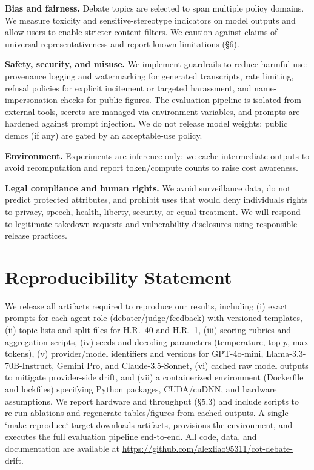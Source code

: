 \documentclass[11pt]{article}
\begin{document}
\textbf{Bias and fairness.} Debate topics are selected to span multiple policy domains. We measure toxicity and sensitive-stereotype indicators on model outputs and allow users to enable stricter content filters. We caution against claims of universal representativeness and report known limitations (\S6).

\textbf{Safety, security, and misuse.} We implement guardrails to reduce harmful use: provenance logging and watermarking for generated transcripts, rate limiting, refusal policies for explicit incitement or targeted harassment, and name-impersonation checks for public figures. The evaluation pipeline is isolated from external tools, secrets are managed via environment variables, and prompts are hardened against prompt injection. We do not release model weights; public demos (if any) are gated by an acceptable-use policy.

\textbf{Environment.} Experiments are inference-only; we cache intermediate outputs to avoid recomputation and report token/compute counts to raise cost awareness.

\textbf{Legal compliance and human rights.} We avoid surveillance data, do not predict protected attributes, and prohibit uses that would deny individuals rights to privacy, speech, health, liberty, security, or equal treatment. We will respond to legitimate takedown requests and vulnerability disclosures using responsible release practices.


\section*{Reproducibility Statement}
We release all artifacts required to reproduce our results, including (i) exact prompts for each agent role (debater/judge/feedback) with versioned templates, (ii) topic lists and split files for H.R.~40 and H.R.~1, (iii) scoring rubrics and aggregation scripts, (iv) seeds and decoding parameters (temperature, top-$p$, max tokens), (v) provider/model identifiers and versions for GPT-4o-mini, Llama-3.3-70B-Instruct, Gemini Pro, and Claude-3.5-Sonnet, (vi) cached raw model outputs to mitigate provider-side drift, and (vii) a containerized environment (Dockerfile and lockfiles) specifying Python packages, CUDA/cuDNN, and hardware assumptions. We report hardware and throughput (\S5.3) and include scripts to re-run ablations and regenerate tables/figures from cached outputs. A single `make reproduce` target downloads artifacts, provisions the environment, and executes the full evaluation pipeline end-to-end. All code, data, and documentation are available at \url{https://github.com/alexliao95311/cot-debate-drift}.
\end{document}
